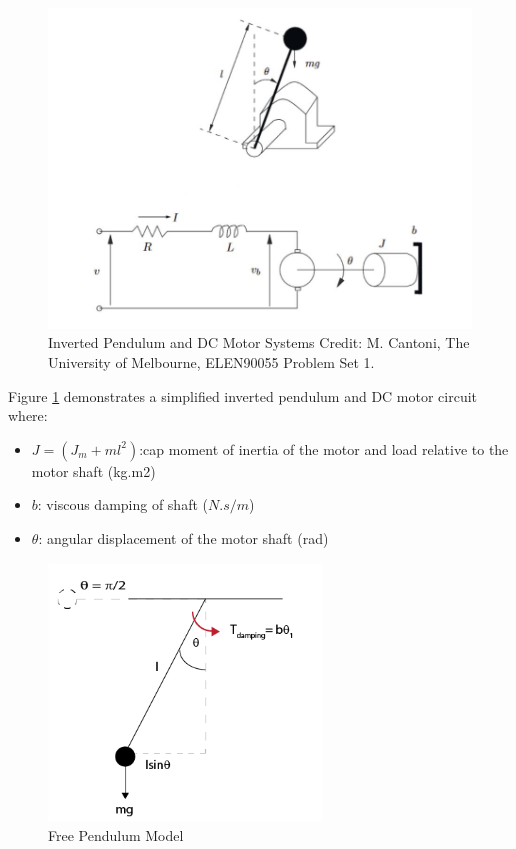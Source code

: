 \documentclass[11pt, a4paper,twocolumn]{article}
\begin{document}
\begin{figure}[h!]
\centering
\includegraphics[scale=0.3]{capture}
\caption{Inverted Pendulum and DC Motor Systems  \tiny Credit: M. Cantoni, The University of Melbourne, ELEN90055 Problem Set 1.}
\label{fig:diagram}
\end{figure}
Figure \ref{fig:diagram} demonstrates a simplified inverted pendulum and DC motor circuit where: 
\begin{itemize}
	\item $J = (J_m + ml^2)$:cap moment of inertia of the motor and load relative to the motor shaft (kg.m2)
	\item $b$: viscous damping of shaft ($N.s/m$)
	\item $\theta$: angular displacement of the motor shaft (rad)
\end{itemize}

\begin{figure}[h!]
\centering
\includegraphics[scale=.5]{22}
\caption{Free Pendulum Model}
\label{fig:pend}
\end{figure}
\end{document}
